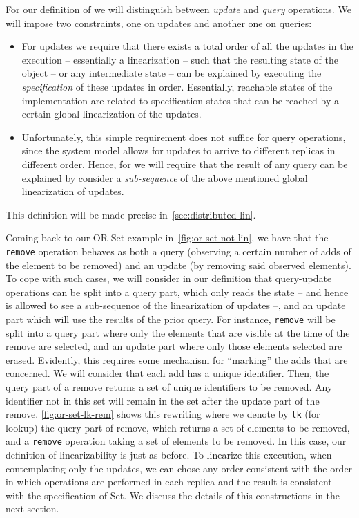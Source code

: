 For our definition of \CRDTLinshort{} we will distinguish between
\emph{update} and \emph{query} operations.
%
We will impose two constraints, one on updates and another one on
queries:
\begin{itemize}
\item For updates we require that there exists a total order of all
  the updates in the execution -- essentially a linearization -- such
  that the resulting state of the object -- or any intermediate state --
  can be explained by executing the \emph{specification} of these
  updates in order.
%
  Essentially, reachable states of the implementation are related to
  specification states that can be reached by a certain global
  linearization of the updates.
%
\item Unfortunately, this simple requirement does not suffice for
  query operations, since the system model allows for updates to arrive
  to different replicas in different order.
%
  Hence, for \CRDTLinshort{} we will require that the result of any
  query can be explained by consider a \emph{sub-sequence} of the above
  mentioned global linearization of updates.
\end{itemize}
This definition will be made precise in~\autoref{sec:distributed-lin}.

Coming back to our OR-Set example in~\autoref{fig:or-set-not-lin}, we
have that the \lstinline|remove| operation behaves as both a query
(observing a certain number of adds of the element to be removed)
and an update (by removing said observed elements).
%
To cope with such cases, we will consider in our definition that
query-update operations can be split into a query part, which only
reads the state -- and hence is allowed to see a sub-sequence of the
linearization of updates --, and an update part which will use the
results of the prior query.
%
For instance, \lstinline|remove| will be split into a query part where
only the elements that are visible at the time of the remove are
selected, and an update part where only those elements selected are
erased.
%
Evidently, this requires some mechanism for ``marking'' the adds that
are concerned.
%
We will consider that each add has a unique identifier.
%
Then, the query part of a remove returns a set of unique identifiers
to be removed.
%
Any identifier not in this set will remain in the set after the update
part of the remove.
%
\autoref{fig:or-set-lk-rem} shows this rewriting
where we denote by \lstinline|lk| (for lookup) the query part of
remove, which returns a set of elements to be removed, and a
\lstinline|remove| operation taking a set of elements to be removed.
%
In this case, our definition of linearizability is just as before.
%
To linearize this execution, when contemplating only the updates, we
can chose any order consistent with the order in which operations are
performed in each replica and the result is consistent with the
specification of Set.
%
We discuss the details of this constructions in the next section.


